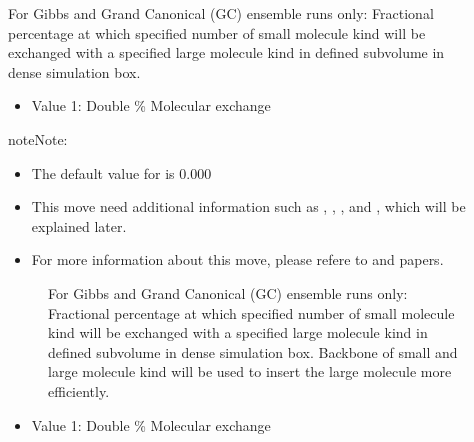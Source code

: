 \documentclass[letterpaper,10pt,english]{sphinxmanual}
\begin{document}
\begin{description}
\item[{}] \leavevmode
\sphinxAtStartPar
For Gibbs and Grand Canonical (GC) ensemble runs only: Fractional percentage at which specified number of small molecule kind will be exchanged with a specified large molecule kind in defined sub\sphinxhyphen{}volume in dense simulation box.
\begin{itemize}
\item {} 
\sphinxAtStartPar
Value 1: Double \sphinxhyphen{} \% Molecular exchange

\end{itemize}

\begin{sphinxadmonition}{note}{Note:}\begin{itemize}
\item {} 
\sphinxAtStartPar
The default value for  is 0.000

\item {} 
\sphinxAtStartPar
This move need additional information such as , , , and , which will be explained later.

\item {} 
\sphinxAtStartPar
For more information about this move, please refere to  and  papers.

\end{itemize}
\end{sphinxadmonition}
\begin{description}
\item[{}] \leavevmode
\sphinxAtStartPar
For Gibbs and Grand Canonical (GC) ensemble runs only: Fractional percentage at which specified number of small molecule kind will be exchanged with a specified large molecule kind in defined sub\sphinxhyphen{}volume in dense simulation box. Backbone of small and large molecule kind will be used to insert the large molecule more efficiently.

\end{description}
\begin{itemize}
\item {} 
\sphinxAtStartPar
Value 1: Double \sphinxhyphen{} \% Molecular exchange


\end{itemize}
\end{description}
\end{document}
